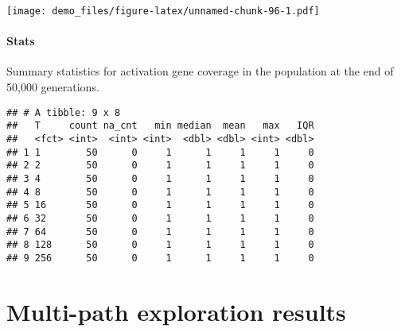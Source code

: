 \documentclass[]{book}
\newenvironment{Shaded}{\begin{snugshade}}{\end{snugshade}}
\newcommand{\DataTypeTok}[1]{\textcolor[rgb]{0.13,0.29,0.53}{#1}}
\newcommand{\KeywordTok}[1]{\textcolor[rgb]{0.13,0.29,0.53}{\textbf{#1}}}
\newcommand{\NormalTok}[1]{#1}
\newcommand{\OperatorTok}[1]{\textcolor[rgb]{0.81,0.36,0.00}{\textbf{#1}}}
\newcommand{\OtherTok}[1]{\textcolor[rgb]{0.56,0.35,0.01}{#1}}
\newcommand{\StringTok}[1]{\textcolor[rgb]{0.31,0.60,0.02}{#1}}
\let\oldparagraph\paragraph
\renewcommand{\paragraph}[1]{\oldparagraph{#1}\mbox{}}
\begin{document}
\texttt{[image: demo\_files/figure-latex/unnamed-chunk-96-1.pdf]}

\hypertarget{stats-17}{%
\paragraph{Stats}\label{stats-17}}

Summary statistics for activation gene coverage in the population at the end of 50,000 generations.

\begin{Shaded}
\end{Shaded}

\begin{verbatim}
## # A tibble: 9 x 8
##   T     count na_cnt   min median  mean   max   IQR
##   <fct> <int>  <int> <int>  <dbl> <dbl> <int> <dbl>
## 1 1        50      0     1      1     1     1     0
## 2 2        50      0     1      1     1     1     0
## 3 4        50      0     1      1     1     1     0
## 4 8        50      0     1      1     1     1     0
## 5 16       50      0     1      1     1     1     0
## 6 32       50      0     1      1     1     1     0
## 7 64       50      0     1      1     1     1     0
## 8 128      50      0     1      1     1     1     0
## 9 256      50      0     1      1     1     1     0
\end{verbatim}

\hypertarget{multi-path-exploration-results-1}{%
\section{Multi-path exploration results}\label{multi-path-exploration-results-1}}
\end{document}
